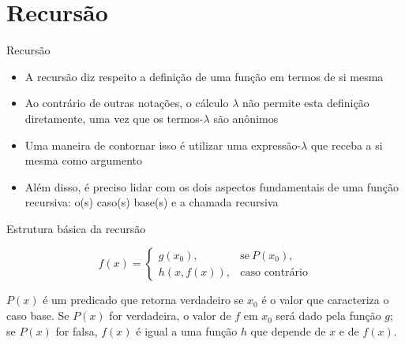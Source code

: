 \section{Recursão}

\begin{frame}[fragile]{Recursão}

    \begin{itemize}
        \item A recursão diz respeito a definição de uma função em termos de si mesma

        \item Ao contrário de outras notações, o cálculo $\lambda$ não permite esta definição
            diretamente, uma vez que os termos-$\lambda$ são anônimos

        \item Uma maneira de contornar isso é utilizar uma expressão-$\lambda$ que receba a 
            si mesma como argumento

        \item Além disso, é preciso lidar com os dois aspectos fundamentais de uma função
            recursiva: o(s) caso(s) base(s) e a chamada recursiva
    \end{itemize}

\end{frame}

\begin{frame}[fragile]{Estrutura básica da recursão}

    \begin{huge}
    \[
        f(x) =  \left\lbrace \begin{array}{ll}
                    g(x_0), & \mbox{se}\ P(x_0), \\
                    h(x, f(x)), & \mbox{caso contrário}
                \end{array} \right.
    \]
    \end{huge}

    \vspace{0.5in}

    $P(x)$ é um predicado que retorna verdadeiro se $x_0$ é o valor que caracteriza o caso base.
    Se $P(x)$ for verdadeira, o valor de $f$ em $x_0$ será dado pela função $g$; se $P(x)$ for
    falsa, $f(x)$ é igual a uma função $h$ que depende de $x$ e de $f(x)$.
\end{frame}

